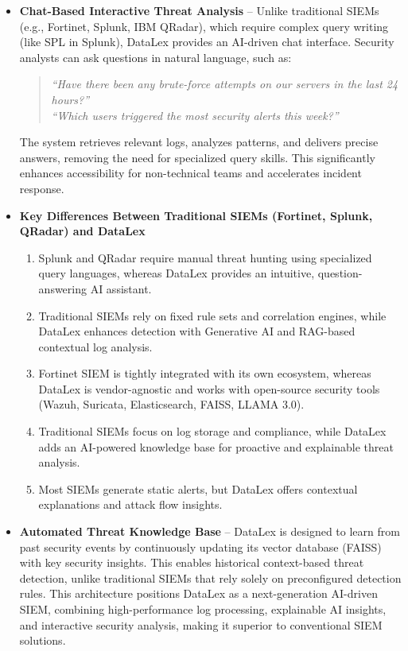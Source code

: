 \begin{itemize}
    \item \textbf{Chat-Based Interactive Threat Analysis} -- Unlike traditional SIEMs (e.g., Fortinet, Splunk, IBM QRadar), which require complex query writing (like SPL in Splunk), DataLex provides an AI-driven chat interface. Security analysts can ask questions in natural language, such as:

    \begin{quote}
    \textit{``Have there been any brute-force attempts on our servers in the last 24 hours?''}\\
    \textit{``Which users triggered the most security alerts this week?''}
    \end{quote}

    The system retrieves relevant logs, analyzes patterns, and delivers precise answers, removing the need for specialized query skills. This significantly enhances accessibility for non-technical teams and accelerates incident response.

    \item \textbf{Key Differences Between Traditional SIEMs (Fortinet, Splunk, QRadar) and DataLex}
    \begin{enumerate}
        \item[a.] Splunk and QRadar require manual threat hunting using specialized query languages, whereas DataLex provides an intuitive, question-answering AI assistant.
        \item[b.] Traditional SIEMs rely on fixed rule sets and correlation engines, while DataLex enhances detection with Generative AI and RAG-based contextual log analysis.
        \item[c.] Fortinet SIEM is tightly integrated with its own ecosystem, whereas DataLex is vendor-agnostic and works with open-source security tools (Wazuh, Suricata, Elasticsearch, FAISS, LLAMA 3.0).
        \item[d.] Traditional SIEMs focus on log storage and compliance, while DataLex adds an AI-powered knowledge base for proactive and explainable threat analysis.
        \item[e.] Most SIEMs generate static alerts, but DataLex offers contextual explanations and attack flow insights.
    \end{enumerate}

    \item \textbf{Automated Threat Knowledge Base} -- DataLex is designed to learn from past security events by continuously updating its vector database (FAISS) with key security insights. This enables historical context-based threat detection, unlike traditional SIEMs that rely solely on preconfigured detection rules. This architecture positions DataLex as a next-generation AI-driven SIEM, combining high-performance log processing, explainable AI insights, and interactive security analysis, making it superior to conventional SIEM solutions.
\end{itemize}
